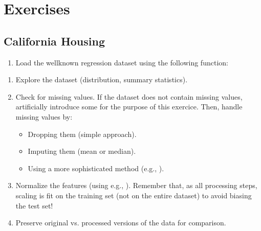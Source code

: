 \documentclass[letterpaper,10pt,english]{jupyterBook}
\begin{document}
\section{Exercises}
\label{\detokenize{03:exercises}}

\subsection{California Housing}
\label{\detokenize{03:california-housing}}\begin{enumerate}
%
\item {} 
\sphinxAtStartPar
Load the well\sphinxhyphen{}known  regression dataset using the following function:

\end{enumerate}

\begin{sphinxVerbatim}[commandchars=\\\{\}]
 
\end{sphinxVerbatim}
\begin{enumerate}
%
\setcounter{enumi}{1}
\item {} 
\sphinxAtStartPar
Explore the dataset (distribution, summary statistics).

\item {} 
\sphinxAtStartPar
Check for missing values. If the dataset does not contain missing values, artificially introduce some for the purpose of this exercice. Then, handle missing values by:
\begin{itemize}
\item {} 
\sphinxAtStartPar
Dropping them (simple approach).

\item {} 
\sphinxAtStartPar
Imputing them (mean or median).

\item {} 
\sphinxAtStartPar
Using a more sophisticated method (e.g., ).

\end{itemize}

\item {} 
\sphinxAtStartPar
Normalize the features (using e.g., ). Remember that, as all processing steps, scaling is fit on the training set (not on the entire dataset) to avoid biasing the test set!

\item {} 
\sphinxAtStartPar
Preserve original vs. processed versions of the data for comparison.

\end{enumerate}
\end{document}
